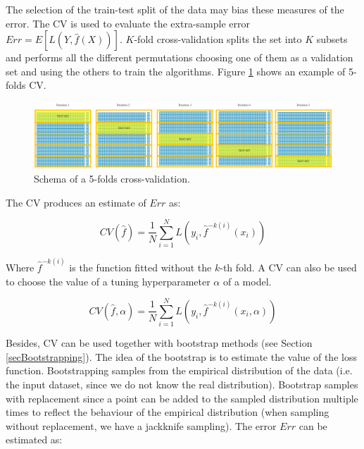 The selection of the train-test split of the data may bias these measures of the error. The CV is used to evaluate the extra-sample error $Err=E[L(Y,\hat{f}(X))]$. $K$-fold cross-validation splits the set into $K$ subsets and performs all the different permutations choosing one of them as a validation set and using the others to train the algorithms. Figure \ref{fig_crossValidation} shows an example of 5-folds CV.

\begin{figure}[hbt!]
\centering
\includegraphics[width=1\textwidth]{SectionLetsMath/linearRegression_figures/fig_crossValidation.png}
\captionsetup{type=figure}
\caption{Schema of a 5-folds cross-validation.}
\label{fig_crossValidation}
\end{figure}

The CV produces an estimate of $Err$ as:

\begin{equation}
CV\left(\hat{f}\right)=\frac{1}{N}\sum_{i=1}^{N}{L(y_i,{\hat{f}}^{-k\left(i\right)}(x_i))}
\label{eq_errCV1}
\end{equation}

Where ${\hat{f}}^{-k\left(i\right)}$ is the function fitted without the $k$-th fold. A CV can also be used to choose the value of a tuning hyperparameter $\alpha$ of a model. 

\begin{equation}
CV\left(\hat{f},\alpha\right)=\frac{1}{N}\sum_{i=1}^{N}{L(y_i,{\hat{f}}^{-k\left(i\right)}(x_i,\alpha))}
\label{eq_errCV2}
\end{equation}

Besides, CV can be used together with bootstrap methods (see Section \ref{secBootstrapping}). The idea of the bootstrap is to estimate the value of the loss function. Bootstrapping samples from the empirical distribution of the data (i.e. the input dataset, since we do not know the real distribution). Bootstrap samples with replacement since a point can be added to the sampled distribution multiple times to reflect the behaviour of the empirical distribution (when sampling without replacement, we have a jackknife sampling). The error $Err$ can be estimated as:


